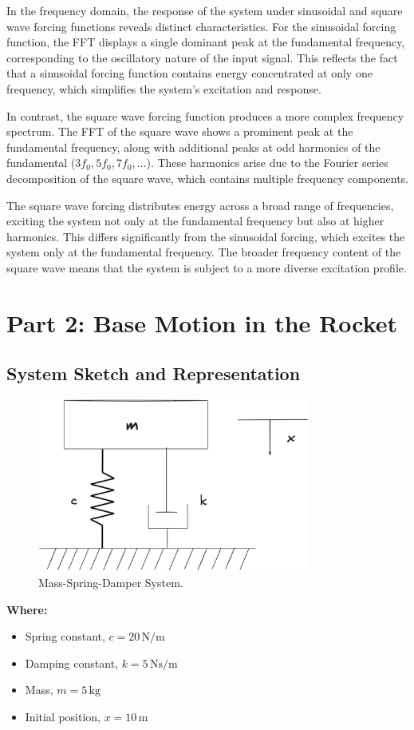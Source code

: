 \documentclass[12pt,a4paper]{article}
\begin{document}
In the frequency domain, the response of the system under sinusoidal and square wave forcing functions reveals distinct characteristics. For the sinusoidal forcing function, the FFT displays a single dominant peak at the fundamental frequency, corresponding to the oscillatory nature of the input signal. This reflects the fact that a sinusoidal forcing function contains energy concentrated at only one frequency, which simplifies the system's excitation and response.

In contrast, the square wave forcing function produces a more complex frequency spectrum. The FFT of the square wave shows a prominent peak at the fundamental frequency, along with additional peaks at odd harmonics of the fundamental (\( 3f_0, 5f_0, 7f_0, \dots \)). These harmonics arise due to the Fourier series decomposition of the square wave, which contains multiple frequency components.

The square wave forcing distributes energy across a broad range of frequencies, exciting the system not only at the fundamental frequency but also at higher harmonics. This differs significantly from the sinusoidal forcing, which excites the system only at the fundamental frequency. The broader frequency content of the square wave means that the system is subject to a more diverse excitation profile.


{\vspace{10pt}}

\section{Part 2: Base Motion in the Rocket}

\subsection{System Sketch and Representation}
\begin{figure}[H]
    \centering
    \includegraphics[width=0.8\textwidth]{msd.png} 
    \caption{Mass-Spring-Damper System.}
    \label{fig:system}
\end{figure}
\textbf{Where:}
\begin{itemize}
    \item Spring constant, \(c = 20 \, \text{N/m}\)
    \item Damping constant, \(k = 5 \, \text{Ns/m}\)
    \item Mass, \(m = 5 \, \text{kg}\)
    \item Initial position, \(x = 10 \, \text{m}\)
\end{itemize}
\end{document}
